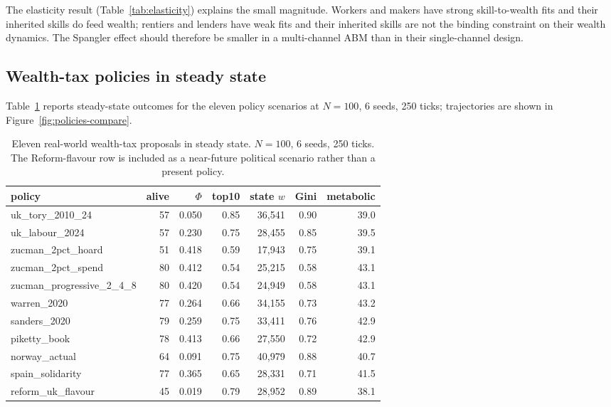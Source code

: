 \documentclass[11pt]{article}
\begin{document}
The elasticity result (Table~\ref{tab:elasticity}) explains the
small magnitude. Workers and makers have strong skill-to-wealth
fits and their inherited skills do feed wealth; rentiers and
lenders have weak fits and their inherited skills are not the
binding constraint on their wealth dynamics. The Spangler effect
should therefore be smaller in a multi-channel ABM than in their
single-channel design.

\subsection{Wealth-tax policies in steady state}
\label{sec:policy}

Table~\ref{tab:policies-100} reports steady-state outcomes for the
eleven policy scenarios at $N=100$, 6 seeds, 250 ticks; trajectories
are shown in Figure~\ref{fig:policies-compare}.

\begin{table}[t]
\centering
\small
\caption{Eleven real-world wealth-tax proposals in steady state.
$N=100$, 6 seeds, 250 ticks. The Reform-flavour row is included as a
near-future political scenario rather than a present policy.}
\label{tab:policies-100}
\begin{tabular}{lrrrrrr}
\toprule
policy & alive & $\Phi$ & top10 & state $w$ & Gini & metabolic \\
\midrule
uk\_tory\_2010\_24            & 57 & 0.050 & 0.85 & 36{,}541 & 0.90 & 39.0 \\
uk\_labour\_2024              & 57 & 0.230 & 0.75 & 28{,}455 & 0.85 & 39.5 \\
zucman\_2pct\_hoard           & 51 & 0.418 & 0.59 & 17{,}943 & 0.75 & 39.1 \\
zucman\_2pct\_spend           & 80 & 0.412 & 0.54 & 25{,}215 & 0.58 & 43.1 \\
zucman\_progressive\_2\_4\_8 & 80 & 0.420 & 0.54 & 24{,}949 & 0.58 & 43.1 \\
warren\_2020                  & 77 & 0.264 & 0.66 & 34{,}155 & 0.73 & 43.2 \\
sanders\_2020                 & 79 & 0.259 & 0.75 & 33{,}411 & 0.76 & 42.9 \\
piketty\_book                 & 78 & 0.413 & 0.66 & 27{,}550 & 0.72 & 42.9 \\
norway\_actual                & 64 & 0.091 & 0.75 & 40{,}979 & 0.88 & 40.7 \\
spain\_solidarity             & 77 & 0.365 & 0.65 & 28{,}331 & 0.71 & 41.5 \\
reform\_uk\_flavour           & 45 & 0.019 & 0.79 & 28{,}952 & 0.89 & 38.1 \\
\bottomrule
\end{tabular}
\end{table}
\end{document}

